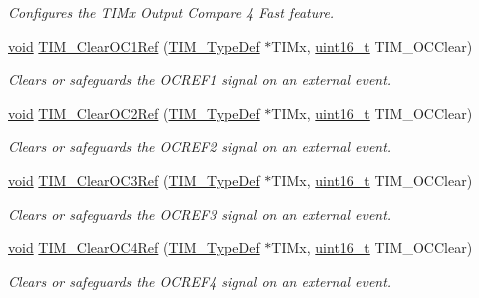 \begin{DoxyCompactItemize}
\begin{DoxyCompactList}\small\item\em Configures the T\-I\-Mx Output Compare 4 Fast feature. \end{DoxyCompactList}\item 
\hyperlink{group___n_a_m_e_ga18028b8badbf1ea7e704ccac3c488e82}{void} \hyperlink{group___t_i_m___group2_ga34e926cd8a99cfcc7480b2d6de5118b6}{T\-I\-M\-\_\-\-Clear\-O\-C1\-Ref} (\hyperlink{struct_t_i_m___type_def}{T\-I\-M\-\_\-\-Type\-Def} $\ast$T\-I\-Mx, \hyperlink{stdint_8h_a273cf69d639a59973b6019625df33e30}{uint16\-\_\-t} T\-I\-M\-\_\-\-O\-C\-Clear)
\begin{DoxyCompactList}\small\item\em Clears or safeguards the O\-C\-R\-E\-F1 signal on an external event. \end{DoxyCompactList}\item 
\hyperlink{group___n_a_m_e_ga18028b8badbf1ea7e704ccac3c488e82}{void} \hyperlink{group___t_i_m___group2_gac474ebc815d24c8a589969e0c68b27b0}{T\-I\-M\-\_\-\-Clear\-O\-C2\-Ref} (\hyperlink{struct_t_i_m___type_def}{T\-I\-M\-\_\-\-Type\-Def} $\ast$T\-I\-Mx, \hyperlink{stdint_8h_a273cf69d639a59973b6019625df33e30}{uint16\-\_\-t} T\-I\-M\-\_\-\-O\-C\-Clear)
\begin{DoxyCompactList}\small\item\em Clears or safeguards the O\-C\-R\-E\-F2 signal on an external event. \end{DoxyCompactList}\item 
\hyperlink{group___n_a_m_e_ga18028b8badbf1ea7e704ccac3c488e82}{void} \hyperlink{group___t_i_m___group2_ga0bd9476a14bd346c319945ec4fa2bc67}{T\-I\-M\-\_\-\-Clear\-O\-C3\-Ref} (\hyperlink{struct_t_i_m___type_def}{T\-I\-M\-\_\-\-Type\-Def} $\ast$T\-I\-Mx, \hyperlink{stdint_8h_a273cf69d639a59973b6019625df33e30}{uint16\-\_\-t} T\-I\-M\-\_\-\-O\-C\-Clear)
\begin{DoxyCompactList}\small\item\em Clears or safeguards the O\-C\-R\-E\-F3 signal on an external event. \end{DoxyCompactList}\item 
\hyperlink{group___n_a_m_e_ga18028b8badbf1ea7e704ccac3c488e82}{void} \hyperlink{group___t_i_m___group2_gaeee5fa66b26e7c6f71850272dc3028f3}{T\-I\-M\-\_\-\-Clear\-O\-C4\-Ref} (\hyperlink{struct_t_i_m___type_def}{T\-I\-M\-\_\-\-Type\-Def} $\ast$T\-I\-Mx, \hyperlink{stdint_8h_a273cf69d639a59973b6019625df33e30}{uint16\-\_\-t} T\-I\-M\-\_\-\-O\-C\-Clear)
\begin{DoxyCompactList}\small\item\em Clears or safeguards the O\-C\-R\-E\-F4 signal on an external event. \end{DoxyCompactList}\item 

\end{DoxyCompactItemize}
